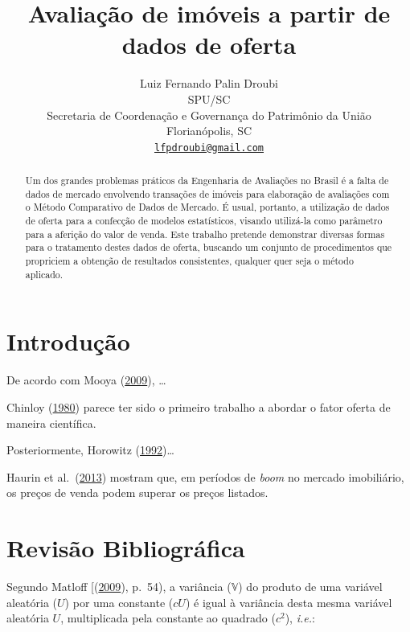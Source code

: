 \documentclass{article}
\title{Avaliação de imóveis a partir de dados de oferta}
\author{
    Luiz Fernando Palin Droubi
   \\
    SPU/SC \\
    Secretaria de Coordenação e Governança do Patrimônio da União \\
  Florianópolis, SC \\
  \texttt{\href{mailto:lfpdroubi@gmail.com}{\nolinkurl{lfpdroubi@gmail.com}}} \\
  }
\begin{document}
\maketitle

\def\tightlist{}


\begin{abstract}
Um dos grandes problemas práticos da Engenharia de Avaliações no Brasil
é a falta de dados de mercado envolvendo transações de imóveis para
elaboração de avaliações com o Método Comparativo de Dados de Mercado. É
usual, portanto, a utilização de dados de oferta para a confecção de
modelos estatísticos, visando utilizá-la como parâmetro para a aferição
do valor de venda. Este trabalho pretende demonstrar diversas formas
para o tratamento destes dados de oferta, buscando um conjunto de
procedimentos que propriciem a obtenção de resultados consistentes,
qualquer quer seja o método aplicado.
\end{abstract}


\hypertarget{introduuxe7uxe3o}{%
\section{Introdução}\label{introduuxe7uxe3o}}

De acordo com Mooya (\protect\hyperlink{ref-mooya2009}{2009}), \ldots{}

Chinloy (\protect\hyperlink{ref-chinloy}{1980}) parece ter sido o
primeiro trabalho a abordar o fator oferta de maneira científica.

Posteriormente, Horowitz
(\protect\hyperlink{ref-horowitz}{1992})\ldots{}

Haurin et al.~(\protect\hyperlink{ref-haurin}{2013}) mostram que, em
períodos de \emph{boom} no mercado imobiliário, os preços de venda podem
superar os preços listados.

\hypertarget{revisuxe3o-bibliogruxe1fica}{%
\section{Revisão Bibliográfica}\label{revisuxe3o-bibliogruxe1fica}}

Segundo Matloff {[}(\protect\hyperlink{ref-matloff2009}{2009}), p.~54),
a variância (\(\mathbb V\)) do produto de uma variável aleatória (\(U\))
por uma constante (\(cU\)) é igual à variância desta mesma variável
aleatória \(U\), multiplicada pela constante ao quadrado (\(c^2\)),
\emph{i.e.}:
\end{document}
